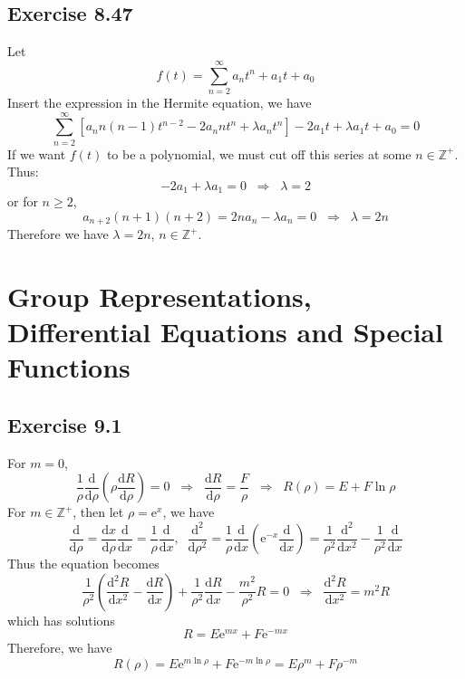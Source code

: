 \documentclass[]{ctexart}
\begin{document}
		\subsection{Exercise 8.47}
		Let 
		\begin{equation*}
		f(t)=\sum_{n=2}^\infty a_n t^n+a_1 t+a_0
		\end{equation*}
		Insert the expression in the Hermite equation, we have 
		\begin{equation*}
		\sum_{n=2}^\infty\left[a_n n(n-1)t^{n-2}-2a_n nt^n+\lambda a_n t^n\right]-2a_1 t+\lambda a_1 t+a_0=0
		\end{equation*}
		If we want $f(t)$ to be a polynomial, we must cut off this series at some $n\in\mathbb Z^+$. Thus: 
		\begin{equation*}
		-2a_1+\lambda a_1=0\;\;\Rightarrow\;\;\lambda=2
		\end{equation*}
		or for $n\ge 2$, 
		\begin{equation*}
		a_{n+2}(n+1)(n+2)=2n a_n-\lambda a_n=0\;\;\Rightarrow\;\;\lambda=2n
		\end{equation*}
		Therefore we have $\lambda=2n$, $n\in\mathbb Z^+$. 
	
	
\section{Group Representations, Differential Equations and Special Functions}
\subsection{Exercise 9.1}
For $m=0$, 
\begin{equation*}
\frac{1}{\rho}\frac{\mathrm{d}}{\mathrm{d}\rho}\left(\rho\frac{\mathrm{d}R}{\mathrm{d}\rho}\right)=0\;\;\Rightarrow\;\;\frac{\mathrm{d}R}{\mathrm{d}\rho}=\frac{F}{\rho}\;\;\Rightarrow\;\;R(\rho)=E+F\ln\rho
\end{equation*}
For $m\in\mathbb Z^+$, then let $\rho=\mathrm{e}^x$, we have 
\begin{equation*}
\frac{\mathrm{d}}{\mathrm{d}\rho}=\frac{\mathrm{d}x}{\mathrm{d}\rho}\frac{\mathrm{d}}{\mathrm{d}x}=\frac{1}{\rho}\frac{\mathrm{d}}{\mathrm{d}x},\;\;\frac{\mathrm{d}^2}{\mathrm{d}\rho^2}=\frac{1}{\rho}\frac{\mathrm{d}}{\mathrm{d}x}\left(\mathrm{e}^{-x}\frac{\mathrm{d}}{\mathrm{d}x}\right)=\frac{1}{\rho^2}\frac{\mathrm{d}^2}{\mathrm{d}x^2}-\frac{1}{\rho^2}\frac{\mathrm{d}}{\mathrm{d}x}
\end{equation*}
Thus the equation becomes
\begin{equation*}
\frac{1}{\rho^2}\left(\frac{\mathrm{d}^2R}{\mathrm{d}x^2}-\frac{\mathrm{d}R}{\mathrm{d}x}\right)+\frac{1}{\rho^2}\frac{\mathrm{d}R}{\mathrm{d}x}-\frac{m^2}{\rho^2}R=0\;\;\Rightarrow\;\;\frac{\mathrm{d}^2R}{\mathrm{d}x^2}=m^2R
\end{equation*}
which has solutions 
\begin{equation*}
R=E\mathrm{e}^{mx}+F\mathrm{e}^{-mx}
\end{equation*}
Therefore, we have 
\begin{equation*}
R(\rho)=E\mathrm{e}^{m\ln\rho}+F\mathrm{e}^{-m\ln\rho}=E\rho^m+F\rho^{-m}
\end{equation*}
\end{document}
